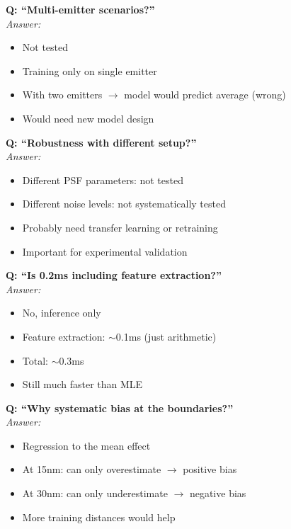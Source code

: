 \documentclass[a4paper,10pt]{article}
\begin{document}
\begin{mdframed}[style=warnung]
\textbf{Q: ``Multi-emitter scenarios?''}\\[5pt]
\textit{Answer:}
\begin{itemize}[leftmargin=*, nosep]
    \item Not tested
    \item Training only on single emitter
    \item With two emitters $\rightarrow$ model would predict average (wrong)
    \item Would need new model design
\end{itemize}
\end{mdframed}

\begin{mdframed}[style=warnung]
\textbf{Q: ``Robustness with different setup?''}\\[5pt]
\textit{Answer:}
\begin{itemize}[leftmargin=*, nosep]
    \item Different PSF parameters: not tested
    \item Different noise levels: not systematically tested
    \item Probably need transfer learning or retraining
    \item Important for experimental validation
\end{itemize}
\end{mdframed}

\begin{mdframed}[style=warnung]
\textbf{Q: ``Is 0.2ms including feature extraction?''}\\[5pt]
\textit{Answer:}
\begin{itemize}[leftmargin=*, nosep]
    \item No, inference only
    \item Feature extraction: $\sim$0.1ms (just arithmetic)
    \item Total: $\sim$0.3ms
    \item Still much faster than MLE
\end{itemize}
\end{mdframed}

\begin{mdframed}[style=warnung]
\textbf{Q: ``Why systematic bias at the boundaries?''}\\[5pt]
\textit{Answer:}
\begin{itemize}[leftmargin=*, nosep]
    \item Regression to the mean effect
    \item At 15nm: can only overestimate $\rightarrow$ positive bias
    \item At 30nm: can only underestimate $\rightarrow$ negative bias
    \item More training distances would help
\end{itemize}
\end{mdframed}
\end{document}
